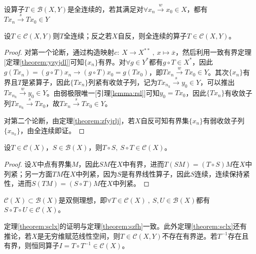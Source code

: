 \begin{definition}[全连续]
设算子$T \in \mathscr{B}(X,Y)$是全连续的，若其满足对$\forall x_n \xrightarrow{w} x_0 \in X$，都有$Tx_n \xrightarrow{s} Tx_0 \in Y$
\end{definition}
\begin{theorem}
设$T \in \mathscr{C}(X,Y)$则$T$全连续；反之若$X$自反，则全连续的算子$T \in \mathscr{C}(X,Y)$。
\end{theorem}
\begin{proof}
对第一个论断，通过构造映射$c: \ X \to X^{**} \ , \ x \mapsto \overline{x}$，然后利用一致有界定理[定理\ref{theorem:yzyjdl}]可知$\{x_n\}$有界。对$\forall g \in Y^*$都有$g \circ T \in X^*$，因此$g(Tx_n)=(g \circ T)x_n \to (g \circ T)x_0=g(Tx_0)$，即$Tx_n \xrightarrow{w} Tx_0 \in Y$。其次$\{x_n\}$有界且$T$是紧算子，因此$\{Tx_n\}$列紧有收敛子列，记为$Tx_{n_k} \xrightarrow{s} y_0 \in Y$，可以推出$Tx_{n_k} \xrightarrow{w} y_0 \in Y$。由弱极限唯一[引理\ref{lemma:rsl}]可知$y_0=Tx_0$，因此$\{Tx_n\}$有收敛子列$Tx_{n_k} \xrightarrow{s} Tx_0$，故$Tx_n \xrightarrow{s} Tx_0 \in Y$。

对第二个论断，由定理\ref{theorem:zfyjrlj}，若$X$自反可知有界集$\{x_n\}$有弱收敛子列$\{x_{n_k}\}$，由全连续即证。
\end{proof}

\begin{theorem}\label{theorem:szfh}
设$T \in \mathscr{C}(X)$，$S \in \mathscr{B}(X)$，则$T \circ S, \ S \circ T \in \mathscr{C}(X)$。
\end{theorem}
\begin{proof}
设$X$中点有界集$M$，因此$SM$在$X$中有界，进而$T(SM)=(T \circ S)M$在$X$中列紧；另一方面$TM$在$X$中列紧，因为$S$是有界线性算子，因此$S$连续，连续保持紧性，进而$S(TM)=(S \circ T)M$在$X$中列紧。
\end{proof}
\begin{theorem}\label{theorem:sclx}
$\mathscr{C}(X) \subset \mathscr{B}(X)$是双侧理想，即$\forall T \in \mathscr{C}(X) \ , \ S,U \in \mathscr{B}(X)$都有$S \circ T \circ U \in \mathscr{C}(X)$。
\end{theorem}
\begin{remark}
\quad 定理\ref{theorem:sclx}的证明与定理\ref{theorem:szfh}一致。此外定理\ref{theorem:sclx}还有推论，若$X$是无穷维赋范线性空间，则$T \in \mathscr{C}(X,Y)$不存在有界逆。若$T^{-1}$存在且有界，则恒同算子$I=T \circ T^{-1} \in \mathscr{C}(X)$。
\end{remark}

